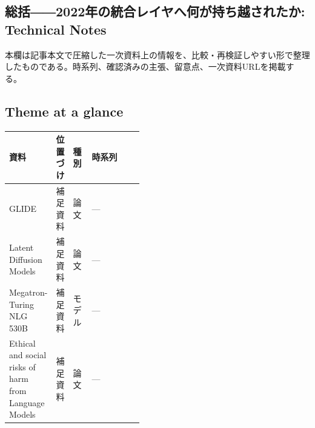 \subsection*{総括――2022年の統合レイヤへ何が持ち越されたか: Technical Notes}
本欄は記事本文で圧縮した一次資料上の情報を、比較・再検証しやすい形で整理したものである。時系列、確認済みの主張、留意点、一次資料URLを掲載する。
\medskip
\subsection*{Theme at a glance}
\begin{center}
\footnotesize
\begin{tabularx}{\linewidth}{@{}p{0.20\linewidth}p{0.10\linewidth}p{0.14\linewidth}X@{}}
\toprule
資料 & 位置づけ & 種別 & 時系列 \\
\midrule
GLIDE & 補足資料 & 論文 & — \\
Latent Diffusion Models & 補足資料 & 論文 & — \\
Megatron-Turing NLG 530B & 補足資料 & モデル & — \\
Ethical and social risks of harm from Language Models & 補足資料 & 論文 & — \\
\bottomrule
\end{tabularx}
\end{center}
\normalsize

